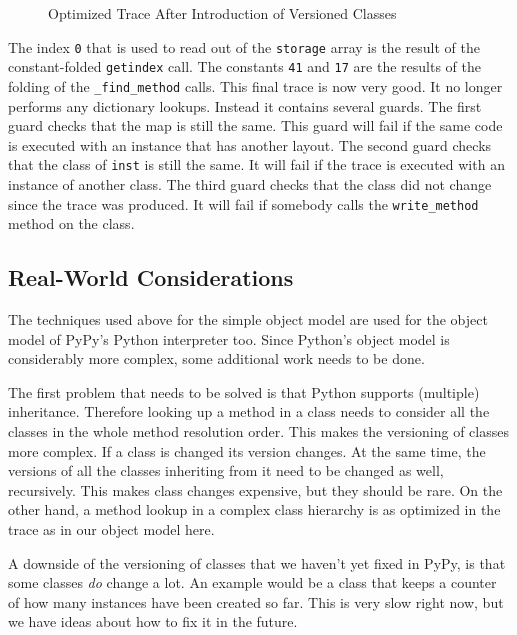 \documentclass{sigplanconf}
\begin{document}
\begin{figure}

\caption{Optimized Trace After Introduction of Versioned Classes}
\label{fig:trace5}
\end{figure}

The index \texttt{0} that is used to read out of the \texttt{storage} array is the result
of the constant-folded \texttt{getindex} call.
The constants \texttt{41} and \texttt{17} are the results of the folding of the
\texttt{\_find\_method} calls. This final trace is now very good. It no longer performs any
dictionary lookups. Instead it contains several guards. The first guard
checks that the map is still the same. This guard will fail if the same
code is executed with an instance that has another layout. The second guard
checks that the class of \texttt{inst} is still the same. It will fail if the trace is
executed with an instance of another class. The third guard checks that the
class did not change since the trace was produced. It will fail if somebody
calls the \texttt{write\_method} method on the class.



\subsection{Real-World Considerations}

The techniques used above for the simple object model are used for the object
model of PyPy's Python interpreter too. Since Python's object model is
considerably more complex, some additional work needs to be done.

The first problem that needs to be solved is that Python supports (multiple)
inheritance. Therefore looking up a method in a class needs to consider all the
classes in the
whole method resolution order. This makes the versioning of classes more
complex. If a class is changed its version changes. At the same time, the
versions of all the classes inheriting from it need to be changed as well,
recursively. This makes class changes expensive, but they should be rare.  On the
other hand, a method lookup in a complex class hierarchy is as optimized in the
trace as in our object model here.

A downside of the versioning of classes that we haven't yet fixed in PyPy, is
that some classes \emph{do} change a lot. An example would be a class that keeps a
counter of how many instances have been created so far. This is very slow right
now, but we have ideas about how to fix it in the future.
\end{document}
